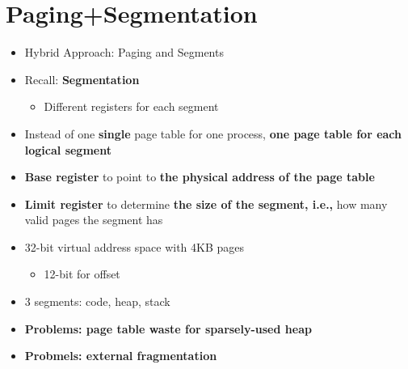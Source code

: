 \documentclass[a4paper,11pt,english]{article}
\begin{document}
\section*{Paging+Segmentation}
\begin{itemize}
    \item Hybrid Approach: Paging and Segments
    \item Recall: \textbf{\color{blue} Segmentation}
        \begin{itemize}
            \item Different registers for each segment
        \end{itemize}
    \item Instead of one \textbf{\color{red} single} page table for one process, 
        \textbf{\color{blue} one page table for each logical segment} 
    \item \textbf{\color{blue} Base register} to point to \textbf{\color{blue} the physical address of the page table}
    \item \textbf{\color{blue} Limit register} to determine \textbf{\color{blue} the size of the segment, i.e.,} how many valid pages the segment has
    \item 32-bit virtual address space with 4KB pages
        \begin{itemize}
            \item 12-bit for offset
        \end{itemize}
    \item 3 segments: code, heap, stack 
    \item \textbf{\color{red} Problems: page table waste for sparsely-used heap}
    \item \textbf{\color{red} Probmels: external fragmentation}
\end{itemize}
\end{document}
